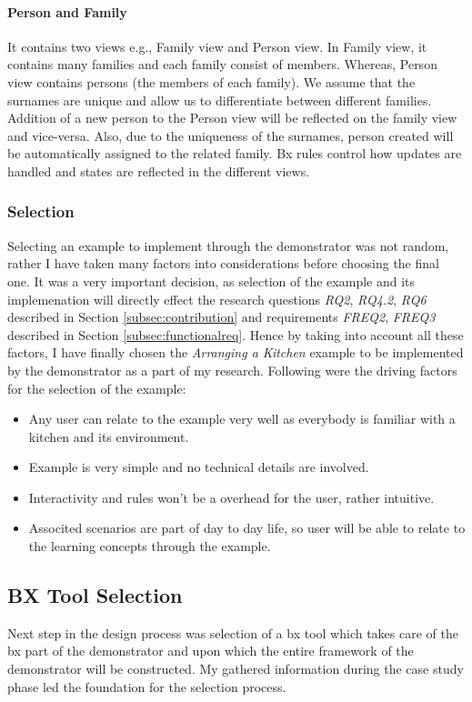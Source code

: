 \paragraph{Person and Family}
It contains two views e.g., Family view and Person view. In Family view, it contains many families and each family consist of members. Whereas, Person view contains persons (the members of each family). We assume that the surnames are unique and allow us to differentiate between different families. Addition of a new person to the Person view will be reflected on the family view and vice-versa. Also, due to the uniqueness of the surnames, person created will be automatically assigned to the related family. Bx rules control how updates are handled and states are reflected in the different views.

\subsubsection{Selection}\label{subsubsec:exampleselection}
Selecting an example to implement through the demonstrator was not random, rather I have taken many factors into considerations before choosing the final one. It was a very important decision, as selection of the example and its implemenation will directly effect the research questions \textit{RQ2}, \textit{RQ4.2}, \textit{RQ6} described in Section \ref{subsec:contribution} and requirements \textit{FREQ2}, \textit{FREQ3} described in Section \ref{subsec:functionalreq}.
\newline\newline Hence by taking into account all these factors, I have finally chosen the \textit{Arranging a Kitchen} example to be implemented by the demonstrator as a part of my research. Following were the driving factors for the selection of the example:
\begin{itemize}
	\item {Any user can relate to the example very well as everybody is familiar with a kitchen and its environment.}
	\item {Example is very simple and no technical details are involved.}
	\item {Interactivity and rules won't be a overhead for the user, rather intuitive.}
	\item {Associted scenarios are part of day to day life, so user will be able to relate to the learning concepts through the example.}
\end{itemize}

\subsection{BX Tool Selection}\label{subsec:bxtoolselection}
Next step in the design process was selection of a bx tool which takes care of the bx part of the demonstrator and upon which the entire framework of the demonstrator will be constructed. My gathered information during the case study phase led the foundation for the selection process.
